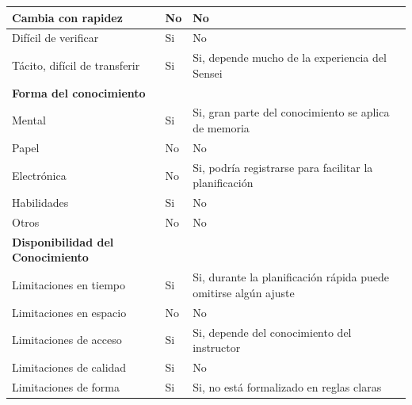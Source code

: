 \documentclass[12pt,a4paper,twoside,spanish]{article}      %
\newcommand{\PreserveBackslash}[1]{\let\temp=\\#1\let\\=\temp}
\let\PBS=\PreserveBackslash
\begin{document}
\begin{table}[H]
\begin{tabularx}{\textwidth}{|p{5cm}|>{\PBS\raggedright}p{0.8cm}|X|}
                Cambia con rapidez& No & No\\ \hline 

                Difícil de verificar& Si & No\\ \hline 

                Tácito, difícil de transferir& Si & Si, depende mucho de la experiencia del Sensei \\ \hline 

                \textbf{Forma del conocimiento} & &\\ \hline

                Mental& Si & Si, gran parte del conocimiento se aplica de memoria\\ \hline

                Papel& No & No\\ \hline 

                Electrónica& No  & Si, podría registrarse para facilitar la planificación\\ \hline

                Habilidades&Si  & No\\ \hline 

                Otros& No & No\\ \hline 

                \textbf{Disponibilidad del Conocimiento} &  &\\ \hline 

                Limitaciones en tiempo& Si  & Si, durante la planificación rápida puede omitirse algún ajuste\\ \hline

                Limitaciones en espacio& No & No \\ \hline 

                Limitaciones de acceso& Si & Si, depende del conocimiento del instructor \\ \hline 

                Limitaciones de calidad& Si & No \\ \hline 

                Limitaciones de forma& Si & Si, no está formalizado en reglas claras \\ \hline
            \end{tabularx}
            \label{tab.TM2}
        \end{table}
\end{document}
